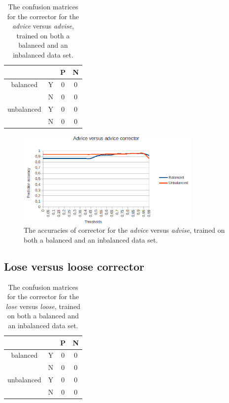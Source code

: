 \documentclass[12pt]{article}
\begin{document}
\begin{table}[H] \footnotesize
\centering
\begin{tabular}{|c|c|c|c|}
\hline
&&P&N\\
\hline
balanced&Y&0&0\\
&N&0&0\\
\hline
\hline
unbalanced&Y&0&0\\
&N&0&0\\
\hline
\end{tabular}
\caption{The confusion matrices for the corrector for the \emph{advice} versus \emph{advise}, trained on both a balanced and an inbalanced data set.}
\end{table}

\begin{figure}[H]
\centering
\includegraphics[width=0.8\textwidth]{accuracy_adviceadvise.png}
\caption{The accuracies of corrector for the \emph{advice} versus \emph{advise}, trained on both a balanced and an inbalanced data set.}
\end{figure}

\subsection{Lose versus loose corrector}

\begin{table}[H] \footnotesize
\centering
\begin{tabular}{|c|c|c|c|}
\hline
&&P&N\\
\hline
balanced&Y&0&0\\
&N&0&0\\
\hline
\hline
unbalanced&Y&0&0\\
&N&0&0\\
\hline
\end{tabular}
\caption{The confusion matrices for the corrector for the \emph{lose} versus \emph{loose}, trained on both a balanced and an inbalanced data set.}
\end{table}
\end{document}
